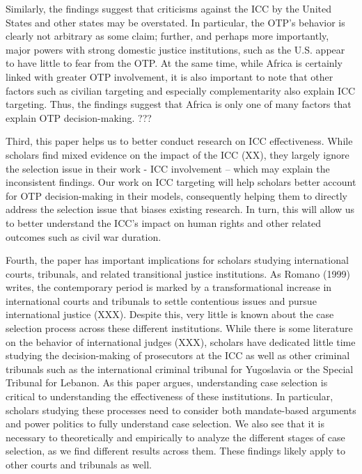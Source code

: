 Similarly, the findings suggest that criticisms against the ICC by the United States and other states may be overstated. In particular, the OTP's behavior is clearly not arbitrary as some claim; further, and perhaps more importantly, major powers with strong domestic justice institutions, such as the U.S. appear to have little to fear from the OTP. At the same time, while Africa is certainly linked with greater OTP involvement, it is also important to note that other factors such as civilian targeting and especially complementarity also explain ICC targeting. Thus, the findings suggest that Africa is only one of many factors that explain OTP decision-making. ???

Third, this paper helps us to better conduct research on ICC effectiveness. While scholars find mixed evidence on the impact of the ICC (XX), they largely ignore the selection issue in their work - ICC involvement -- which may explain the inconsistent findings. Our work on ICC targeting will help scholars better account for OTP decision-making in their models, consequently helping them to directly address the selection issue that biases existing research. In turn, this will allow us to better understand the ICC's impact on human rights and other related outcomes such as civil war duration.

Fourth, the paper has important implications for scholars studying international courts, tribunals, and related transitional justice institutions. As Romano (1999) writes, the contemporary period is marked by a transformational increase in international courts and tribunals to settle contentious issues and pursue international justice (XXX). Despite this, very little is known about the case selection process across these different institutions. While there is some literature on the behavior of international judges (XXX), scholars have dedicated little time studying the decision-making of prosecutors at the ICC as well as other criminal tribunals such as the international criminal tribunal for Yugoslavia or the Special Tribunal for Lebanon. As this paper argues, understanding case selection is critical to understanding the effectiveness of these institutions. In particular, scholars studying these processes need to consider both mandate-based arguments and power politics to fully understand case selection. We also see that it is necessary to theoretically and empirically to analyze the different stages of case selection, as we find different results across them. These findings likely apply to other courts and tribunals as well.

